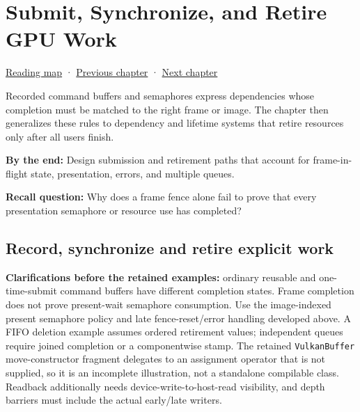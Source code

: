 \chapter{Submit, Synchronize, and Retire GPU Work}\label{01-foundations-i-ch014-submit-synchronize-and-retire-gpu-work}\hypertarget{01-foundations-i-ch014}{}\label{stagechapter:01-foundations-i-ch014}

\hypertarget{01-foundations-i-ch014-submit-synchronize-and-retire-gpu-work}{}

\hyperref[volume-reading-map]{Reading map} · \hyperref[01-foundations-i-ch013-open-vulkan-devices-and-describe-resources]{Previous chapter} · \hyperref[01-foundations-i-ch015-execute-and-measure-a-metal-frame]{Next chapter}

Recorded command buffers and semaphores express dependencies whose completion must be matched to the right frame or image. The chapter then generalizes these rules to dependency and lifetime systems that retire resources only after all users finish.

\textbf{By the end:} Design submission and retirement paths that account for frame-in-flight state, presentation, errors, and multiple queues.

\textbf{Recall question:} Why does a frame fence alone fail to prove that every presentation semaphore or resource use has completed?

\section{Record, synchronize and retire explicit work}\label{01-foundations-i-ch014-record-synchronize-and-retire-explicit-work}

\hypertarget{01-foundations-i-ch014-record-synchronize-and-retire-explicit-work}{}

\textbf{Clarifications before the retained examples:} ordinary reusable and one-time-submit command buffers have different completion states. Frame completion does not prove present-wait semaphore consumption. Use the image-indexed present semaphore policy and late fence-reset/error handling developed above. A FIFO deletion example assumes ordered retirement values; independent queues require joined completion or a componentwise stamp. The retained \texttt{VulkanBuffer} move-constructor fragment delegates to an assignment operator that is not supplied, so it is an incomplete illustration, not a standalone compilable class. Readback additionally needs device-write-to-host-read visibility, and depth barriers must include the actual early/late writers.

